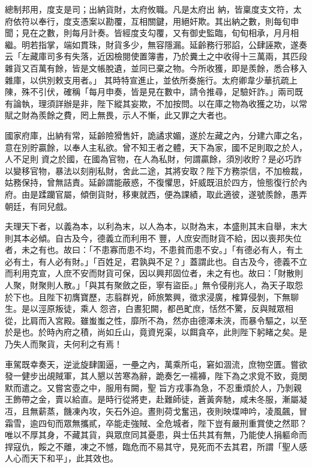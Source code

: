 \begin{pinyinscope}
 總制邦用，度支是司；出納貨財，太府攸職。凡是太府出
 納，皆稟度支文符，太府依符以奉行，度支憑案以勘覆，互相關鍵，用絕奸欺。其出納之數，則每旬申聞；見在之數，則每月計奏。皆經度支勾覆，又有御史監臨，旬旬相承，月月相繼。明若指掌，端如貫珠，財貨多少，無容隱漏。延齡務行邪諂，公肆誣欺，遂奏云「左藏庫司多有失落，近因檢閱使置簿書，乃於糞土之中收得十三萬兩，其匹段雜貨又百萬有餘，皆是文帳脫遺，並同已棄之物。今所收獲，即是羨餘，悉合移入雜庫，以供別敕支用者。」
 其時特宣進止，並依所奏施行。太府卿韋少華抗疏上陳，殊不引伏，確稱「每月申奏，皆是見在數中，請令推尋，足驗奸詐。」兩司既有論執，理須詳辦是非，陛下縱其妄欺，不加按問。以在庫之物為收獲之功，以常賦之財為羨餘之費，罔上無畏，示人不慚，此又罪之大者也。



 國家府庫，出納有常，延齡險猾售奸，詭譎求媚，遂於左藏之內，分建六庫之名，意在別貯贏餘，以奉人主私欲。曾不知王者之體，天下為家，國不足則取之於人，人不足則
 資之於國，在國為官物，在人為私財，何謂贏餘，須別收貯？是必巧詐以變移官物，暴法以刻削私財，舍此二途，其將安取？陛下方務崇信，不加檢裁，姑務保持，曾無詰責。延齡謂能蔽惑，不復懼思，奸威既沮於四方，憸態復行於內府。由是蹂躪官屬，傾倒貨財，移東就西，便為課績，取此適彼，遂號羨餘，愚弄朝廷，有同兒戲。



 夫理天下者，以義為本，以利為末，以人為本，以財為末，本盛則其末自舉，末大則其本必傾。自古及今，德義立而利用不
 豐，人庶安而財貨不給，因以喪邦失位者，未之有也。故曰：「不患寡而患不均，不患貧而患不安。」「有德必有人，有土必有土，有人必有財。」「百姓足，君孰與不足？」蓋謂此也。自古及今，德義不立而利用克宣，人庶不安而財貨可保，因以興邦固位者，未之有也。故曰：「財散則人聚，財聚則人散。」「與其有聚斂之臣，寧有盜臣。」無令侵削兆人，為天子取怨於下也。且陛下初膺寶歷，志翦群兇，師旅繁興，徵求浸廣，榷算侵剝，下無聊生。是以涇原叛徒，乘人
 怨咨，白晝犯闕，都邑甿庶，恬然不驚，反與賊眾相從，比肩而入宮殿。雖蚩蚩之性，靡所不為，然亦由德澤未浹，而暴令驅之，以至於是也。於時內府之積，尚如丘山，竟資兇渠，以餌貪卒，此則陛下躬睹之矣。是乃失人而聚貨，夫何利之有焉！



 車駕既幸奏天，逆泚旋肆圍逼，一壘之內，萬乘所屯，窘如涸流，庶物空匱。嘗欲發一健步出覘賊軍，其人懇以苦寒為辭，跪奏乞一襦褲，陛下為之求覓不致，竟閔默而遣之。又嘗宮壺之中，服用有闕，聖
 旨方戎事為急，不忍重煩於人，乃剝親王飾帶之金，賣以給直。是時行從將吏，赴難師徒，蒼黃奔馳，咸未冬服，漸屬凝冱，且無薪蒸，饑凍內攻，矢石外迫。晝則荷戈奮迅，夜則映堞呻吟，凌風飆，冒霜雪，逾四旬而眾無攜貳，卒能走強賊、全危城者，陛下豈有嚴刑重賞使之然耶？唯以不厚其身，不藏其貨，與眾庶同其憂患，與士伍共其有無，乃能使人捐軀命而捍寇仇，餒之不離，凍之不憾，臨危而不易其守，見死而不去其君，所謂「聖人感
 人心而天下和平」，此其效也。




\end{pinyinscope}
